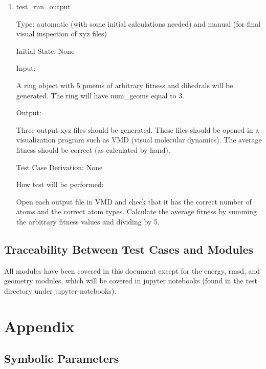 \documentclass[12pt, titlepage]{article}
\begin{document}

\begin{enumerate}
	
\item{test\_run\_output\\}

Type: automatic (with some initial calculations needed) and manual (for final 
visual inspection of xyz files)

Initial State: None

Input: 

A ring object with 5 pmems of arbitrary fitness and dihedrals will be 
generated. The ring will have num\_geoms equal to 3.

Output:

Three output xyz files should be generated. These files should be opened in a 
visualization program such as VMD (visual molecular dynamics). The average 
fitness should be correct (as calculated by hand).

Test Case Derivation: None

How test will be performed: 

Open each output file in VMD and check that it has the correct number of atoms 
and the correct atom types. Calculate the average fitness by summing the 
arbitrary fitness values and dividing by 5.
	
\end{enumerate}

\subsection{Traceability Between Test Cases and Modules}

All modules have been covered in this document except for the energy, rmsd, and 
geometry modules, which will be covered in jupyter notebooks (found in the test 
directory under jupyter-notebooks).





\newpage

\section{Appendix}


\subsection{Symbolic Parameters}

\end{document}
